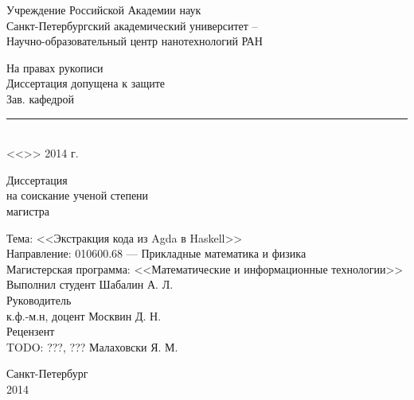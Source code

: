 \begin{titlepage}

\begin{center}
Учреждение Российской Академии наук\\
Санкт-Петербургский академический университет --\\
Научно-образовательный центр нанотехнологий РАН
\end{center}

\vspace{1cm}

\begin{flushright}
\begin{minipage}{0.5\textwidth}
\begin{center}
На правах рукописи\\[.5cm]
Диссертация допущена к защите\\
Зав. кафедрой\\[.3cm]
\rule{7cm}{.5pt}\\
<<\hspace{.8cm}>> \underline{\hspace{3.5cm}} 2014 г.\\
\end{center}
\end{minipage}
\end{flushright}

\vspace{1cm}

\begin{center}
Диссертация\\
на соискание ученой степени\\
магистра
\end{center}

\begin{flushleft}
Тема: <<Экстракция кода из Agda в Haskell>>\\[.5cm]

Направление: 010600.68 --- Прикладные математика и физика\\[.5cm]

Магистерская программа: <<Математические и информационные технологии>>\\[1cm]

Выполнил студент \hfill Шабалин А. Л.\\[.5cm]

Руководитель\\
к.ф.-м.н, доцент \hfill Москвин Д. Н.\\[.5cm]

Рецензент\\
TODO: ???, ??? \hfill Малаховски Я. М.
\end{flushleft}

\vfill

\begin{center}
Санкт-Петербург\\
2014
\end{center}

\end{titlepage}
